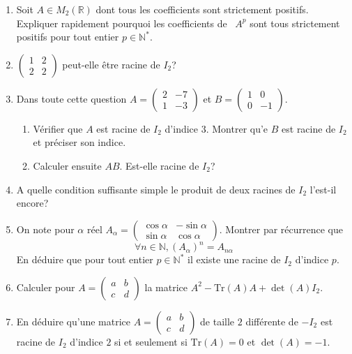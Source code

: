 \documentclass[12pt,a4paper]{article}
\newcommand{\R}{\mathbb{R}}
\newcommand{\N}{\mathbb{N}}
\theoremstyle{break}
\theoremstyle{break}
\begin{document}
\begin{enumerate}
	
	\item Soit $A\in M_{2}(\R)$ dont tous les coefficients
	sont strictement positifs. Expliquer rapidement pourquoi les coefficients de
	\ $A^{p}$ sont tous  strictement positifs pour tout entier $p\in \N^*$.
	\item $\left(\begin{array}{cc}1 & 2 \\2 & 2\end{array}\right)$ peut-elle être racine de $I_{2}$?
	
	\item Dans toute cette question $A=
	\begin{pmatrix}
		2 & -7 \\ 
		1 & -3
	\end{pmatrix}
	$ et $B= 
	\begin{pmatrix}
		1 & 0 \\ 
		0 & -1
	\end{pmatrix}
	$.
	
	\begin{enumerate}
		\item Vérifier que $A$ est racine de $I_{2}$ d'indice $3$. Montrer qu'e $B$ est  racine de $I_{2}$ et préciser son indice.
		
		\item Calculer ensuite $AB$. Est-elle racine de $I_{2}$? 		
	\end{enumerate}
	\item 		 A quelle condition suffisante simple le produit de deux racines de $I_{2}$ l'est-il encore?
	
	\item On note pour $\alpha $ réel $A_{\alpha }=
	\begin{pmatrix}
		\cos \alpha & -\sin \alpha \\ 
		\sin \alpha & \cos \alpha
	\end{pmatrix}$.
	Montrer par récurrence que $$\forall n\in \N,\left(A_{\alpha }\right)^{n}=A_{n\alpha }$$
	En déduire que pour tout
	entier $p\in \N^*$ il existe une racine de $I_{2}$ d'indice $p$.
	
	
	
	\item Calculer pour $A= 
	\begin{pmatrix}
		a & b \\ 
		c & d
	\end{pmatrix}
	$ la matrice $A^{2}-\mathrm{Tr}\left( A\right) A+\det \left( A\right) I_{2}.$
	

	
	\item En déduire qu'une matrice $A= 
	\begin{pmatrix}
		a & b \\ 
		c & d
	\end{pmatrix}
	$ de taille $2$ différente de $-I_{2}$ est racine de $I_{2}$
	d'indice $2$ si et seulement si $\mathrm{Tr}\left( A\right) =0$ et $\det \left( A\right) =-1$.
\end{enumerate}
\end{document}
